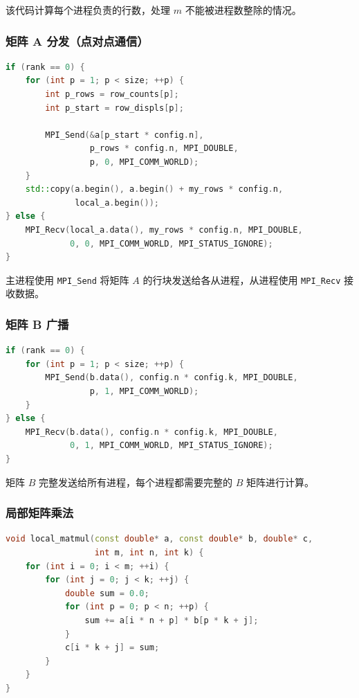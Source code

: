 \documentclass[UTF8,a4paper,12pt]{ctexart}
\begin{document}
该代码计算每个进程负责的行数，处理 $m$ 不能被进程数整除的情况。

\subsubsection{矩阵 A 分发（点对点通信）}

\begin{lstlisting}[language=C++]
if (rank == 0) {
    for (int p = 1; p < size; ++p) {
        int p_rows = row_counts[p];
        int p_start = row_displs[p];
        
        MPI_Send(&a[p_start * config.n],
                 p_rows * config.n, MPI_DOUBLE,
                 p, 0, MPI_COMM_WORLD);
    }
    std::copy(a.begin(), a.begin() + my_rows * config.n,
              local_a.begin());
} else {
    MPI_Recv(local_a.data(), my_rows * config.n, MPI_DOUBLE,
             0, 0, MPI_COMM_WORLD, MPI_STATUS_IGNORE);
}
\end{lstlisting}

主进程使用 \texttt{MPI\_Send} 将矩阵 $A$ 的行块发送给各从进程，从进程使用 \texttt{MPI\_Recv} 接收数据。

\subsubsection{矩阵 B 广播}

\begin{lstlisting}[language=C++]
if (rank == 0) {
    for (int p = 1; p < size; ++p) {
        MPI_Send(b.data(), config.n * config.k, MPI_DOUBLE,
                 p, 1, MPI_COMM_WORLD);
    }
} else {
    MPI_Recv(b.data(), config.n * config.k, MPI_DOUBLE,
             0, 1, MPI_COMM_WORLD, MPI_STATUS_IGNORE);
}
\end{lstlisting}

矩阵 $B$ 完整发送给所有进程，每个进程都需要完整的 $B$ 矩阵进行计算。

\subsubsection{局部矩阵乘法}

\begin{lstlisting}[language=C++]
void local_matmul(const double* a, const double* b, double* c, 
                  int m, int n, int k) {
    for (int i = 0; i < m; ++i) {
        for (int j = 0; j < k; ++j) {
            double sum = 0.0;
            for (int p = 0; p < n; ++p) {
                sum += a[i * n + p] * b[p * k + j];
            }
            c[i * k + j] = sum;
        }
    }
}
\end{lstlisting}
\end{document}
